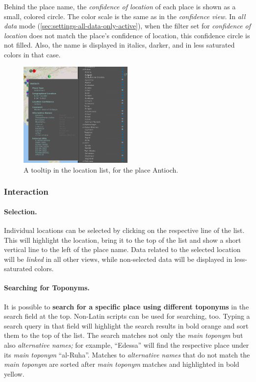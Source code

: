 Behind the place name, the \emph{confidence of location} of each place is shown as a small, colored circle.
The color scale is the same as in the \emph{confidence view.}
In \emph{all data} mode (\cref{sec:settings-all-data-only-active}), when the filter set for \emph{confidence of location} does not match the place’s confidence of location, this confidence circle is not filled.
Also, the name is displayed in italics, darker, and in less saturated colors in that case.

\begin{figure}[tb]
  \centering
  \includegraphics[width=0.5\textwidth]{../src/assets/visualization-documentation/location-list-2.png}
  \caption{
    A tooltip in the location list, for the place Antioch.
  }
  \label{fig:location-list-2}
\end{figure}


\subsubsection{Interaction}
\label{sec:location-list-interaction}

\paragraph{Selection.}
Individual locations can be selected by clicking on the respective line of the list.
This will highlight the location, bring it to the top of the list and show a short vertical line to the left of the place name.
Data related to the selected location will be \emph{linked} in all other views, while non-selected data will be displayed in less-saturated colors.

\paragraph{Searching for Toponyms.}
\label{sec:location-list-search-toponyms}
It is possible to \textbf{search for a specific place using different toponyms} in the search field at the top.
Non-Latin scripts can be used for searching, too.
Typing a search query in that field will highlight the search results in bold orange and sort them to the top of the list.
The search matches not only the \emph{main toponym} but also \emph{alternative names;}
for example, \enquote{Edessa} will find the respective place under its \emph{main toponym} \enquote{al-Ruha}.
Matches to \emph{alternative names} that do not match the \emph{main toponym} are sorted after \emph{main toponym} matches and highlighted in bold yellow.

